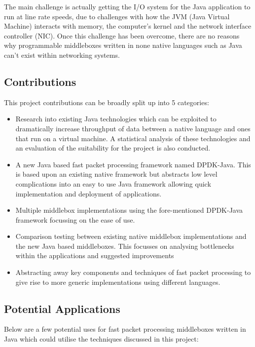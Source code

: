 \documentclass[final_report.tex]{subfiles}
\begin{document}
The main challenge is actually getting the I/O system for the Java application to run at line rate speeds, due to challenges with how the JVM (Java Virtual Machine) interacts with memory, the computer's kernel and the network interface controller (NIC). Once this challenge has been overcome, there are no reasons why programmable middleboxes written in none native languages such as Java can't exist within networking systems.

\newpage

\subsection{Contributions}
This project contributions can be broadly split up into 5 categories:

\begin{itemize}
	\item Research into existing Java technologies which can be exploited to dramatically increase throughput of data between a native language and ones that run on a virtual machine. A statistical analysis of these technologies and an evaluation of the suitability for the project is also conducted.
	\item A new Java based fast packet processing framework named DPDK-Java. This is based upon an existing native framework but abstracts low level complications into an easy to use Java framework allowing quick implementation and deployment of applications.
	\item Multiple middlebox implementations using the fore-mentioned DPDK-Java framework focussing on the ease of use.
	\item Comparison testing between existing native middlebox implementations and the new Java based middleboxes. This focusses on analysing bottlenecks within the applications and suggested improvements
	\item Abstracting away key components and techniques of fast packet processing to give rise to more generic implementations using different languages.
\end{itemize}


\subsection{Potential Applications}
Below are a few potential uses for fast packet processing middleboxes written in Java which could utilise the techniques discussed in this project:
\end{document}
